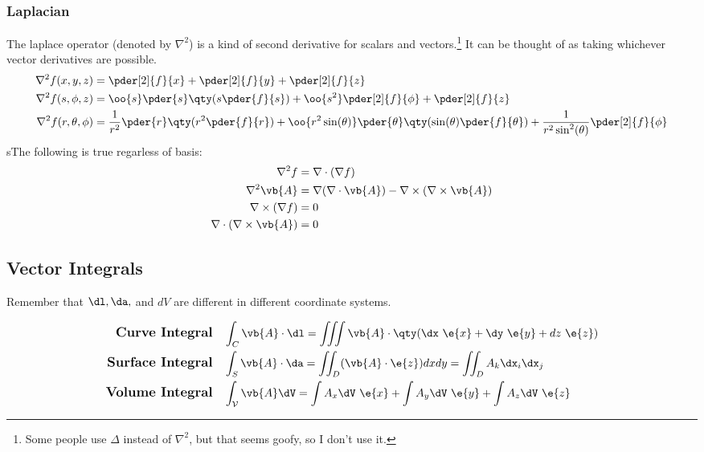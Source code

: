     \subsubsection*{Laplacian}
        The laplace operator (denoted by \(\nabla^2\)) is a kind of second derivative for scalars and vectors.\footnote{Some people use \(\Delta\) instead of \(\nabla^2\), but that seems goofy, so I don't use it.} It can be thought of as taking whichever vector derivatives are possible. 
        \begin{align}
            \nabla^2 f(x,y,z)
            &=
            \pder[2]{f}{x}+
            \pder[2]{f}{y}+
            \pder[2]{f}{z}
            \\
            \nabla^2 f(s,\phi,z)
            &=
            \oo{s}\pder{s}\qty(s\pder{f}{s}) 
            + \oo{{s}^2}\pder[2]{f}{\phi} 
            + \pder[2]{f}{z} 
            \\
            \nabla^2 f(r,\theta,\phi)
            &= 
            \frac{1}{r^2} \pder{r}\qty(r^2 \pder{f}{r}) 
            + \oo{r^2 \sin(\theta)} \pder{\theta} \qty(\sin(\theta)\pder{f}{\theta}) 
            + \frac{1}{r^2 \sin^2(\theta)} \pder[2]{f}{\phi}
        \end{align}
        sThe following is true regarless of basis:
		\begin{align}
            \nabla^2f
            &=\nabla \cdot (\nabla f)
            \\
            \nabla^2 \vb{A} 
            &= \nabla(\nabla \cdot \vb{A}) - \nabla\times (\nabla \times \vb{A}) 
			\\
            \nabla\times (\nabla f)
            &= 0
            \\
            \nabla \cdot (\nabla \times \vb{A}) 
            &= 0 
        \end{align}
\newpage
\subsection{Vector Integrals}      
    Remember that \(\dl,\da,\) and \(dV\) are different in different coordinate systems.

    \begin{align}
        \textbf{ \large Curve Integral}&
        \quad\int_C \vb{A}\cdot\dl=\iiint\vb{A}\cdot\qty(\dx\ \e{x}+\dy\ \e{y}+dz\ \e{z})
        \\
        \textbf{\large Surface Integral}&\quad
        \int_S \vb{A}\cdot\da=\iint_D(\vb{A}\cdot\e{z})dxdy=\iint_D A_k \dx_i\dx_j
        \\
        \textbf{\large Volume Integral}&\quad
        \int_{\mathcal{V}} \vb{A} \dV=\int A_x\dV\ \e{x}+\int A_y\dV\ \e{y}+\int A_z \dV\ \e{z}
    \end{align}


